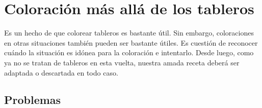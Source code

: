 \section{Coloraci\'on m\'as all\'a de los tableros}

Es un hecho de que colorear tableros es bastante \'util. Sin embargo, coloraciones en otras situaciones tambi\'en pueden ser bastante \'utiles. Es cuesti\'on de reconocer cu\'ando la situaci\'on es id\'onea para la coloraci\'on e intentarlo. Desde luego, como ya no se tratan de tableros en esta vuelta, nuestra amada receta deber\'a ser adaptada o descartada en todo caso.

\subsection{Problemas}

